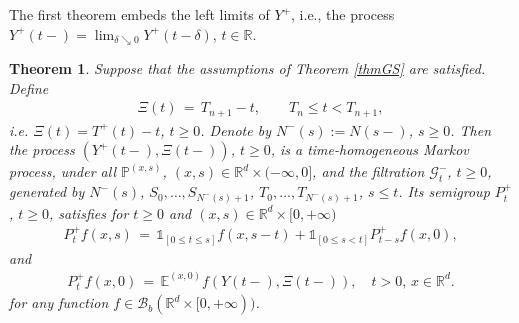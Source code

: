 \documentclass[reqno]{amsart}
\newtheorem{theorem}{Theorem}[section] %
\theoremstyle{remark}
\numberwithin{equation}{section} %
\newcommand{\RR}{\mathbb{R}}
\newcommand{\PP}{\mathds{P}}
\newcommand{\1}{\mathds{1}}
\begin{document}
	The first theorem embeds the left limits of $Y^+$, i.e., the process $Y^+(t-)=\lim_{\delta\searrow0}Y^+(t-\delta)$, $t\in\RR$.
	
	\begin{theorem}
		\label{thmGS+}
		Suppose that the assumptions of Theorem \ref{thmGS} are satisfied. Define
		\begin{align}\label{next-jump}
			\Xi(t) \, = \, T_{n+1}-t, \qquad T_n \le  t < T_{n+1},
		\end{align}
		i.e. $\Xi (t) = T^+(t)-t$, $t \geq 0$. Denote by $N^-(s):= N(s-)$, $s \geq 0$.
		Then the process $(Y^+(t-), \Xi(t-))$, $t \geq 0$, is a time-homogeneous Markov process, under all $\PP^{(x,s)}$, $(x,s)\in \RR^d\times (-\infty,0]$, and the filtration $\mathcal{G}^-_t$, $t \geq 0$, generated by $N^-(s)$, $S_0, \dots, S_{N^-(s)+1}$, $T_0, \dots, T_{N^-(s)+1}$, $s \leq t$. Its semigroup $P_t^+$, $t \geq 0$, satisfies for $t\ge 0$ and $(x,s)\in\RR^d\times [0,+\infty)$
		\begin{align}\label{710-a1}
			P_t^+f(x,s) \, = \, \mathds{1}_{[0 \leq t \le  s]} f(x,s-t)+ \mathds{1}_{[0 \leq s <t]} P_{t-s}^+f(x,0),
		\end{align}
		and
		\begin{align}\label{710-b1}
			P_t^+f(x,0) \, = \, \mathds{E}^{(x,0)}f(Y(t-), \Xi(t-)),\quad t>0,\, x\in \RR^d.
		\end{align}
		for any function $f \in \mathcal{B}_b (\mathbb{R}^d \times [0, +\infty))$.
	\end{theorem}
\end{document}
